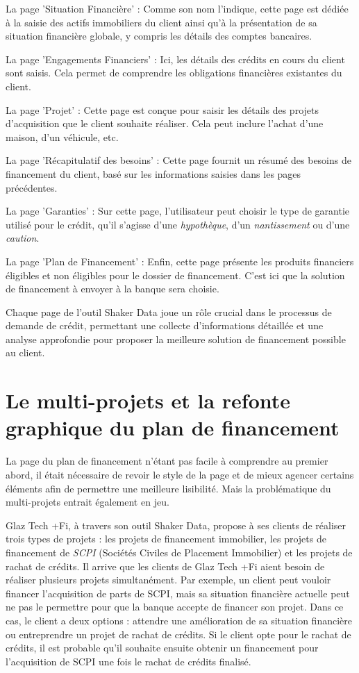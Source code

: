 \documentclass[12pt,oneside,noprintercorrection]{iut}
\begin{document}
La page 'Situation Financière' : Comme son nom l'indique, cette page est dédiée à la saisie des actifs immobiliers du client ainsi qu'à la présentation de sa situation financière globale, y compris les détails des comptes bancaires.

La page 'Engagements Financiers' : Ici, les détails des crédits en cours du client sont saisis. Cela permet de comprendre les obligations financières existantes du client.

La page 'Projet' : Cette page est conçue pour saisir les détails des projets d'acquisition que le client souhaite réaliser. Cela peut inclure l'achat d'une maison, d'un véhicule, etc.

La page 'Récapitulatif des besoins' : Cette page fournit un résumé des besoins de financement du client, basé sur les informations saisies dans les pages précédentes.

La page 'Garanties' : Sur cette page, l'utilisateur peut choisir le type de garantie utilisé pour le crédit, qu'il s'agisse d'une \textit{hypothèque}, d'un \textit{nantissement} ou d'une \textit{caution}.

La page 'Plan de Financement' : Enfin, cette page présente les produits financiers éligibles et non éligibles pour le dossier de financement. C'est ici que la solution de financement à envoyer à la banque sera choisie.

Chaque page de l'outil Shaker Data joue un rôle crucial dans le processus de demande de crédit, permettant une collecte d'informations détaillée et une analyse approfondie pour proposer la meilleure solution de financement possible au client.

\section{Le multi-projets et la refonte graphique du plan de financement}

La page du plan de financement n'étant pas facile à comprendre au premier abord, il était nécessaire de revoir le style de la page et de mieux agencer certains éléments afin de permettre une meilleure lisibilité. Mais la problématique du multi-projets entrait également en jeu. 

Glaz Tech +Fi, à travers son outil Shaker Data, propose à ses clients de réaliser trois types de projets : 
les projets de financement immobilier, les projets de financement de \textit{SCPI} (Sociétés Civiles de Placement Immobilier) et les projets de rachat de crédits. \newline
 \indent Il arrive que les clients de Glaz Tech +Fi aient besoin de réaliser plusieurs projets simultanément. Par exemple, un client peut vouloir financer l'acquisition de parts de SCPI, mais sa situation financière actuelle peut ne pas le permettre pour que la banque accepte de financer son projet. Dans ce cas, le client a deux options : attendre une amélioration de sa situation financière ou entreprendre un projet de rachat de crédits. Si le client opte pour le rachat de crédits, il est probable qu'il souhaite ensuite obtenir un financement pour l'acquisition de SCPI une fois le rachat de crédits finalisé.
\end{document}
